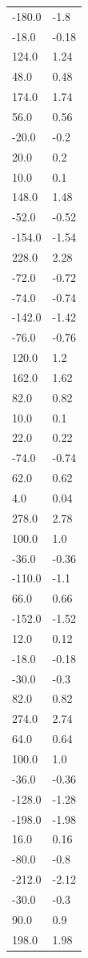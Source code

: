 \begin{longtable}{ll}
-180.0 & -1.8 \\
-18.0 & -0.18 \\
124.0 & 1.24 \\
48.0 & 0.48 \\
174.0 & 1.74 \\
56.0 & 0.56 \\
-20.0 & -0.2 \\
20.0 & 0.2 \\
10.0 & 0.1 \\
148.0 & 1.48 \\
-52.0 & -0.52 \\
-154.0 & -1.54 \\
228.0 & 2.28 \\
-72.0 & -0.72 \\
-74.0 & -0.74 \\
-142.0 & -1.42 \\
-76.0 & -0.76 \\
120.0 & 1.2 \\
162.0 & 1.62 \\
82.0 & 0.82 \\
10.0 & 0.1 \\
22.0 & 0.22 \\
-74.0 & -0.74 \\
62.0 & 0.62 \\
4.0 & 0.04 \\
278.0 & 2.78 \\
100.0 & 1.0 \\
-36.0 & -0.36 \\
-110.0 & -1.1 \\
66.0 & 0.66 \\
-152.0 & -1.52 \\
12.0 & 0.12 \\
-18.0 & -0.18 \\
-30.0 & -0.3 \\
82.0 & 0.82 \\
274.0 & 2.74 \\
64.0 & 0.64 \\
100.0 & 1.0 \\
-36.0 & -0.36 \\
-128.0 & -1.28 \\
-198.0 & -1.98 \\
16.0 & 0.16 \\
-80.0 & -0.8 \\
-212.0 & -2.12 \\
-30.0 & -0.3 \\
90.0 & 0.9 \\
198.0 & 1.98 \\

\end{longtable}
